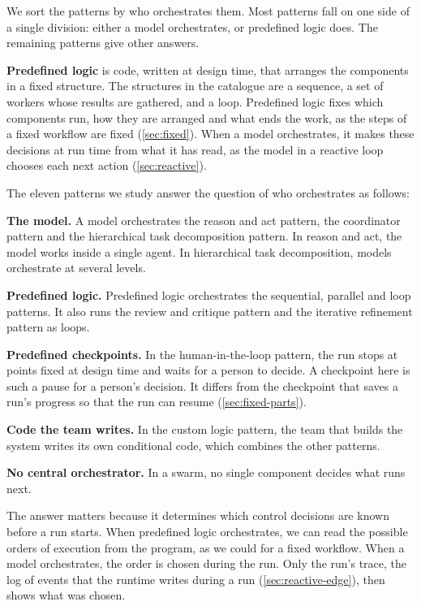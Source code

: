 We sort the patterns by who orchestrates them. Most patterns fall on one side of a single division:
either a model orchestrates, or predefined logic does. The remaining patterns give other answers.

\textbf{Predefined logic} is code, written at design time, that arranges the components in a fixed
structure. The structures in the catalogue are a sequence, a set of workers whose results are
gathered, and a loop. Predefined logic fixes
which components run, how they are arranged and what ends the work, as the steps of a fixed
workflow are fixed (\cref{sec:fixed}). When a model orchestrates, it makes these decisions at run
time from what it has read, as the model in a reactive loop chooses each next action
(\cref{sec:reactive}).

The eleven patterns we study answer the question of who orchestrates as follows:
\bi
\item \textbf{The model.} A model orchestrates the reason and act pattern, the coordinator pattern
and the hierarchical task decomposition pattern. In reason and act, the model works inside a single
agent. In hierarchical task decomposition, models orchestrate at several levels.
\item \textbf{Predefined logic.} Predefined logic orchestrates the sequential, parallel and loop
patterns. It also runs the review and critique pattern and the iterative refinement pattern as
loops.
\item \textbf{Predefined checkpoints.} In the human-in-the-loop pattern, the run stops at points
fixed at design time and waits for a person to decide. A checkpoint here is such a pause for a
person's decision. It differs from the checkpoint that saves a run's progress so that the run can
resume (\cref{sec:fixed-parts}).
\item \textbf{Code the team writes.} In the custom logic pattern, the team that builds the system
writes its own conditional code, which combines the other patterns.
\item \textbf{No central orchestrator.} In a swarm, no single component decides what runs next.
\ei

The answer matters because it determines which control decisions are known before a run starts.
When predefined logic orchestrates, we can read the possible orders of execution from the program,
as we could for a fixed workflow. When a model orchestrates, the order is chosen during the run.
Only the run's trace, the log of events that the runtime writes during a run
(\cref{sec:reactive-edge}), then shows what was chosen.

